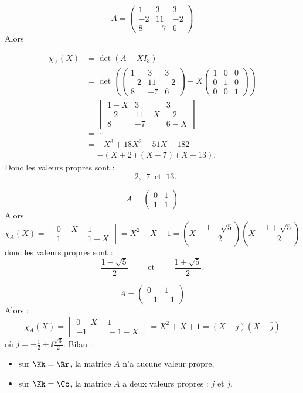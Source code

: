 \documentclass[11pt, class=report,crop=false]{standalone}
\begin{document}
\begin{exemple}
$$A = \begin{pmatrix}
1 & 3 & 3 \\
-2 & 11 & -2 \\
8 & -7 & 6
\end{pmatrix}$$
Alors 

\begin{align*}
\chi_A(X) 
 & = \det(A-XI_3) \\ 
 & =  \det \left(
\begin{pmatrix}
1 & 3 & 3 \\
-2 & 11 & -2 \\
8 & -7 & 6
\end{pmatrix}
- X 
\begin{pmatrix}
1 & 0 & 0 \\
0 & 1 & 0 \\
0 & 0 & 1
\end{pmatrix}
\right) \\
 & = \begin{vmatrix}
1-X & 3 & 3 \\
-2 & 11-X & -2 \\
8 & -7 & 6-X
\end{vmatrix} \\
 & = \cdots \\
 & = -X^3 + 18X^2 -51X - 182 \\
 & = -(X+2)(X-7)(X-13).
 \end{align*}
Donc les valeurs propres sont :
$$-2, \ \ 7\  \text{ et }\  13.$$ 
\end{exemple}

\begin{exemple}
$$A = \begin{pmatrix}0 & 1\\1 &1\end{pmatrix}$$
Alors 
\[\chi_A(X) 
= \begin{vmatrix}0-X\  & \ 1\\1\  & \ 1-X\end{vmatrix}
= X^2 -X -1 
= \left(X-\frac{1-\sqrt{5}}{2}\right)\left(X-\frac{1+\sqrt{5}}{2}\right)\]
donc les valeurs propres sont :
$$\frac{1-\sqrt{5}}{2} \qquad \text{ et } \qquad \frac{1+\sqrt{5}}{2}.$$ 
\end{exemple}


\begin{exemple}
$$A = \begin{pmatrix}0 & 1\\-1 &-1\end{pmatrix}$$
Alors :
\[\chi_A(X) 
= \begin{vmatrix}0-X\  & \ 1\\-1\  & \ -1 -X\end{vmatrix}
= X^2 + X +1 
= (X-j)(X-\bar j)\]
où $j = -\frac{1}{2}+\ii\frac{\sqrt{3}}{2}$. 
Bilan :
\begin{itemize}
  \item sur $\Kk = \Rr$, la matrice $A$ n'a aucune valeur propre,
  \item sur $\Kk = \Cc$, la matrice $A$ a deux valeurs propres : $j$ et $\bar j$. 
\end{itemize}
\end{exemple}
\end{document}
